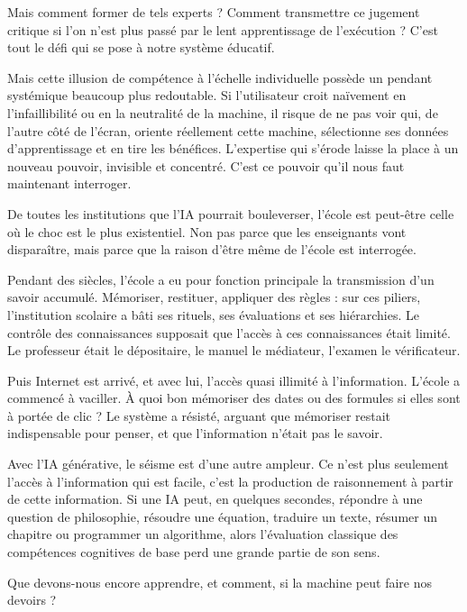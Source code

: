 Mais comment former de tels experts ? Comment transmettre ce jugement critique si l'on n'est plus passé par le lent apprentissage de l'exécution ? C'est tout le défi qui se pose à notre système éducatif.

Mais cette illusion de compétence à l'échelle individuelle possède un pendant systémique beaucoup plus redoutable. Si l'utilisateur croit naïvement en l'infaillibilité ou en la neutralité de la machine, il risque de ne pas voir qui, de l'autre côté de l'écran, oriente réellement cette machine, sélectionne ses données d'apprentissage et en tire les bénéfices. L'expertise qui s'érode laisse la place à un nouveau pouvoir, invisible et concentré. C'est ce pouvoir qu'il nous faut maintenant interroger.


De toutes les institutions que l'IA pourrait bouleverser, l'école est peut-être celle où le choc est le plus existentiel. Non pas parce que les enseignants vont disparaître, mais parce que la raison d'être même de l'école est interrogée.

Pendant des siècles, l'école a eu pour fonction principale la transmission d'un savoir accumulé. Mémoriser, restituer, appliquer des règles : sur ces piliers, l'institution scolaire a bâti ses rituels, ses évaluations et ses hiérarchies. Le contrôle des connaissances supposait que l'accès à ces connaissances était limité. Le professeur était le dépositaire, le manuel le médiateur, l'examen le vérificateur.

Puis Internet est arrivé, et avec lui, l'accès quasi illimité à l'information. L'école a commencé à vaciller. À quoi bon mémoriser des dates ou des formules si elles sont à portée de clic ? Le système a résisté, arguant que mémoriser restait indispensable pour penser, et que l'information n'était pas le savoir.

Avec l'IA générative, le séisme est d'une autre ampleur. Ce n'est plus seulement l'accès à l'information qui est facile, c'est la production de raisonnement à partir de cette information. Si une IA peut, en quelques secondes, répondre à une question de philosophie, résoudre une équation, traduire un texte, résumer un chapitre ou programmer un algorithme, alors l'évaluation classique des compétences cognitives de base perd une grande partie de son sens.

\begin{aiquote}
Que devons-nous encore apprendre, et comment, si la machine peut faire nos devoirs ?
\end{aiquote}

